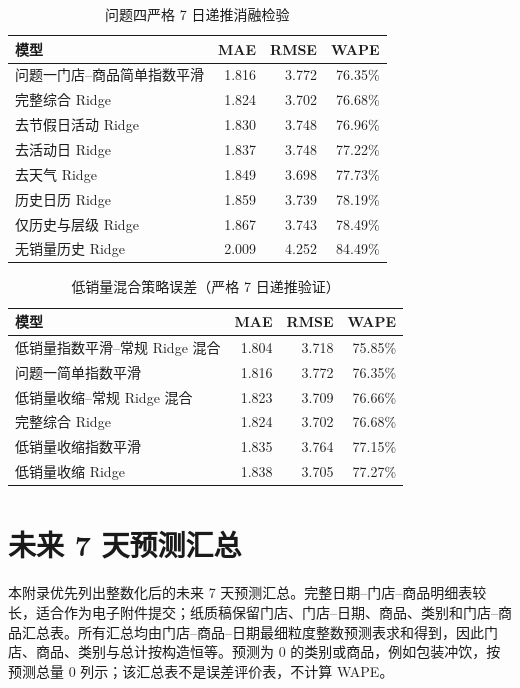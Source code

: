 \begin{table}[H]
\centering
\caption{问题四严格 7 日递推消融检验}
\begin{tabular}{lrrr}
\toprule
模型 & MAE & RMSE & WAPE \\
\midrule
问题一门店--商品简单指数平滑 & 1.816 & 3.772 & 76.35\% \\
完整综合 Ridge & 1.824 & 3.702 & 76.68\% \\
去节假日活动 Ridge & 1.830 & 3.748 & 76.96\% \\
去活动日 Ridge & 1.837 & 3.748 & 77.22\% \\
去天气 Ridge & 1.849 & 3.698 & 77.73\% \\
历史日历 Ridge & 1.859 & 3.739 & 78.19\% \\
仅历史与层级 Ridge & 1.867 & 3.743 & 78.49\% \\
无销量历史 Ridge & 2.009 & 4.252 & 84.49\% \\
\bottomrule
\end{tabular}
\end{table}

\begin{table}[H]
\centering
\caption{低销量混合策略误差（严格 7 日递推验证）}
\begin{tabular}{lrrr}
\toprule
模型 & MAE & RMSE & WAPE \\
\midrule
低销量指数平滑--常规 Ridge 混合 & 1.804 & 3.718 & 75.85\% \\
问题一简单指数平滑 & 1.816 & 3.772 & 76.35\% \\
低销量收缩--常规 Ridge 混合 & 1.823 & 3.709 & 76.66\% \\
完整综合 Ridge & 1.824 & 3.702 & 76.68\% \\
低销量收缩指数平滑 & 1.835 & 3.764 & 77.15\% \\
低销量收缩 Ridge & 1.838 & 3.705 & 77.27\% \\
\bottomrule
\end{tabular}
\end{table}

\section{未来 7 天预测汇总}

本附录优先列出整数化后的未来 7 天预测汇总。完整日期--门店--商品明细表较长，适合作为电子附件提交；纸质稿保留门店、门店--日期、商品、类别和门店--商品汇总表。所有汇总均由门店--商品--日期最细粒度整数预测表求和得到，因此门店、商品、类别与总计按构造恒等。预测为 0 的类别或商品，例如包装冲饮，按预测总量 0 列示；该汇总表不是误差评价表，不计算 WAPE。


